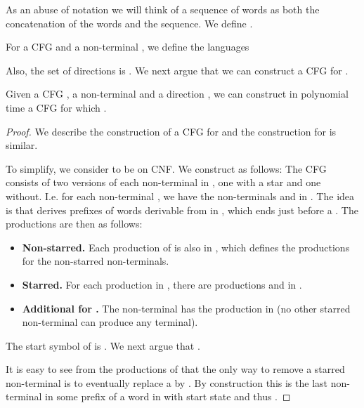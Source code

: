 \documentclass{CSML}
\begin{document}
As an abuse of notation we will think of a sequence of words as both the concatenation of the words and the sequence.
We define .

 \smallskip{}
For a CFG  and a non-terminal , we define the languages 

Also, the set of directions  is .
We next argue that we can construct a CFG for .

\begin{lem}\label{lem:L(G,A,D)}
Given a CFG , a non-terminal  and a direction , we can construct in polynomial time 
a CFG  for which .
\end{lem}
\begin{proof}
We describe the construction of a CFG for  and the construction for  is similar.

To simplify, we consider  to be on CNF. We construct  as follows: The CFG  consists of two versions of each non-terminal in , one with a star and one without. I.e. for each non-terminal , we have the non-terminals  and  in . The idea is that  derives prefixes of words derivable from  in , which ends just before a . 
The productions are then as follows: 
\begin{itemize}
\item {\bf Non-starred.} Each production of  is also in , which defines the productions for the non-starred non-terminals.
\item {\bf Starred.} For each production  in , there are productions  and  in .
\item {\bf Additional for .} The non-terminal  has the production  in  (no other starred non-terminal can produce any terminal). 
\end{itemize}
The start symbol of  is . 
We next argue that .

\smallskip{}
It is easy to see from the productions of  that the only way to remove a starred non-terminal is to eventually replace a  by . By construction this is the last non-terminal in some prefix  of a word in  with start state  and thus . 



\end{proof}
\end{document}
